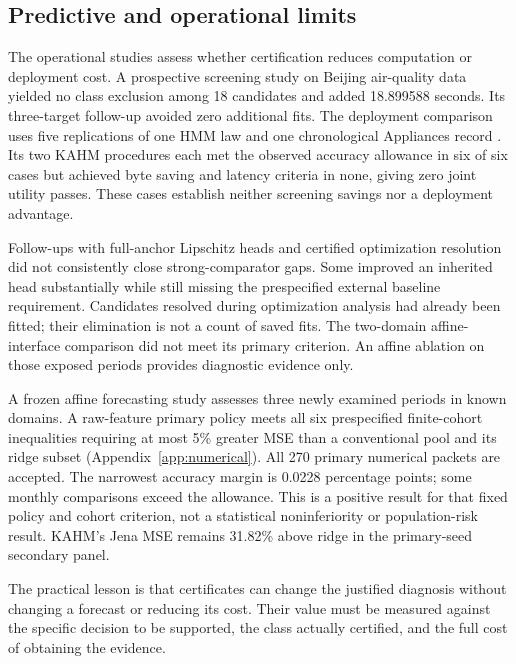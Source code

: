 \subsection{Predictive and operational limits}
The operational studies assess whether certification reduces computation or deployment cost. A prospective screening study on Beijing air-quality data \citep{chen2015beijing} yielded no class exclusion among 18 candidates and added 18.899588 seconds. Its three-target follow-up avoided zero additional fits. The deployment comparison uses five replications of one HMM law and one chronological Appliances record \citep{candanedo2017appliances}. Its two KAHM procedures each met the observed accuracy allowance in six of six cases but achieved byte saving and latency criteria in none, giving zero joint utility passes. These cases establish neither screening savings nor a deployment advantage.

Follow-ups with full-anchor Lipschitz heads and certified optimization resolution did not consistently close strong-comparator gaps. Some improved an inherited head substantially while still missing the prespecified external baseline requirement. Candidates resolved during optimization analysis had already been fitted; their elimination is not a count of saved fits. The two-domain affine-interface comparison did not meet its primary criterion. An affine ablation on those exposed periods provides diagnostic evidence only.

A frozen affine forecasting study assesses three newly examined periods in known domains. A raw-feature primary policy meets all six prespecified finite-cohort inequalities requiring at most 5\% greater MSE than a conventional pool and its ridge subset (Appendix~\ref{app:numerical}). All 270 primary numerical packets are accepted. The narrowest accuracy margin is 0.0228 percentage points; some monthly comparisons exceed the allowance. This is a positive result for that fixed policy and cohort criterion, not a statistical noninferiority or population-risk result. KAHM's Jena MSE remains 31.82\% above ridge in the primary-seed secondary panel.

The practical lesson is that certificates can change the justified diagnosis without changing a forecast or reducing its cost. Their value must be measured against the specific decision to be supported, the class actually certified, and the full cost of obtaining the evidence.

